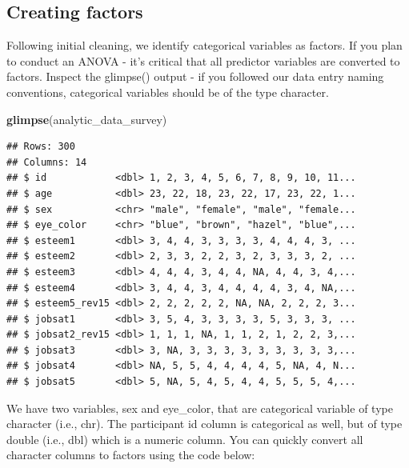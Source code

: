 \documentclass[
]{krantz}
\makeatletter
\newenvironment{Shaded}{\begin{snugshade}}{\end{snugshade}}
\newcommand{\DataTypeTok}[1]{\textcolor[rgb]{0.27,0.27,0.27}{#1}}
\newcommand{\KeywordTok}[1]{\textcolor[rgb]{0.27,0.27,0.27}{\textbf{#1}}}
\newcommand{\NormalTok}[1]{#1}
\newcommand{\OperatorTok}[1]{\textcolor[rgb]{0.43,0.43,0.43}{\textbf{#1}}}
\newcommand{\StringTok}[1]{\textcolor[rgb]{0.5,0.5,0.5}{#1}}
\newenvironment{kframe}{%
\medskip{}
\setlength{\fboxsep}{.8em}
 \def\at@end@of@kframe{}%
 \ifinner\ifhmode%
  \def\at@end@of@kframe{\end{minipage}}%
  \begin{minipage}{\columnwidth}%
 \fi\fi%
 \def\FrameCommand##1{\hskip\@totalleftmargin \hskip-\fboxsep
 \colorbox{shadecolor}{##1}\hskip-\fboxsep
     \hskip-\linewidth \hskip-\@totalleftmargin \hskip\columnwidth}%
 \MakeFramed {\advance\hsize-\width
   \@totalleftmargin\z@ \linewidth\hsize
   \@setminipage}}%
 {\par\unskip\endMakeFramed%
 \at@end@of@kframe}
\renewenvironment{Shaded}{\begin{kframe}}{\end{kframe}}
\makeatother
\begin{document}
\hypertarget{creating-factors-3}{%
\subsection{Creating factors}\label{creating-factors-3}}

Following initial cleaning, we identify categorical variables as factors. If you plan to conduct an ANOVA - it's critical that all predictor variables are converted to factors. Inspect the glimpse() output - if you followed our data entry naming conventions, categorical variables should be of the type character.

\begin{Shaded}
\begin{Highlighting}[]
\KeywordTok{glimpse}\NormalTok{(analytic_data_survey)}
\end{Highlighting}
\end{Shaded}

\begin{verbatim}
## Rows: 300
## Columns: 14
## $ id            <dbl> 1, 2, 3, 4, 5, 6, 7, 8, 9, 10, 11...
## $ age           <dbl> 23, 22, 18, 23, 22, 17, 23, 22, 1...
## $ sex           <chr> "male", "female", "male", "female...
## $ eye_color     <chr> "blue", "brown", "hazel", "blue",...
## $ esteem1       <dbl> 3, 4, 4, 3, 3, 3, 3, 4, 4, 4, 3, ...
## $ esteem2       <dbl> 2, 3, 3, 2, 2, 3, 2, 3, 3, 3, 2, ...
## $ esteem3       <dbl> 4, 4, 4, 3, 4, 4, NA, 4, 4, 3, 4,...
## $ esteem4       <dbl> 3, 4, 4, 3, 4, 4, 4, 4, 3, 4, NA,...
## $ esteem5_rev15 <dbl> 2, 2, 2, 2, 2, NA, NA, 2, 2, 2, 3...
## $ jobsat1       <dbl> 3, 5, 4, 3, 3, 3, 3, 5, 3, 3, 3, ...
## $ jobsat2_rev15 <dbl> 1, 1, 1, NA, 1, 1, 2, 1, 2, 2, 3,...
## $ jobsat3       <dbl> 3, NA, 3, 3, 3, 3, 3, 3, 3, 3, 3,...
## $ jobsat4       <dbl> NA, 5, 5, 4, 4, 4, 4, 5, NA, 4, N...
## $ jobsat5       <dbl> 5, NA, 5, 4, 5, 4, 4, 5, 5, 5, 4,...
\end{verbatim}

We have two variables, sex and eye\_color, that are categorical variable of type character (i.e., chr). The participant id column is categorical as well, but of type double (i.e., dbl) which is a numeric column. You can quickly convert all character columns to factors using the code below:

\begin{Shaded}
\end{Shaded}
\end{document}
